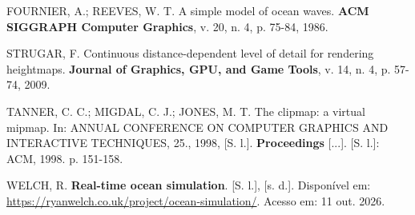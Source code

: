 \documentclass[conference]{IEEEtran}
\begin{document}
FOURNIER, A.; REEVES, W. T. A simple model of ocean waves. \textbf{ACM
SIGGRAPH Computer Graphics}, v. 20, n. 4, p. 75-84, 1986.

STRUGAR, F. Continuous distance-dependent level of detail for rendering
heightmaps. \textbf{Journal of Graphics, GPU, and Game Tools}, v. 14, n. 4,
p. 57-74, 2009.

TANNER, C. C.; MIGDAL, C. J.; JONES, M. T. The clipmap: a virtual mipmap.
In: ANNUAL CONFERENCE ON COMPUTER GRAPHICS AND INTERACTIVE TECHNIQUES, 25.,
1998, [S. l.]. \textbf{Proceedings} [...]. [S. l.]: ACM, 1998. p. 151-158.

WELCH, R. \textbf{Real-time ocean simulation}. [S. l.], [s. d.].
Disponível em: \url{https://ryanwelch.co.uk/project/ocean-simulation/}.
Acesso em: 11 out. 2026.
\endgroup
\end{document}
